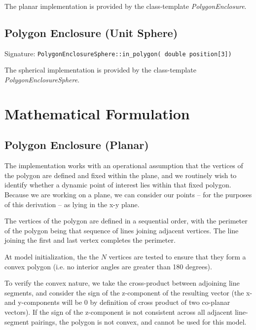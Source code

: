 \documentclass[11pt,fleqn]{report}
\begin{document}
The planar implementation is provided by the class-template
\textit{PolygonEnclosure}.

\subsection{Polygon Enclosure (Unit Sphere)}
Signature: \texttt{PolygonEnclosureSphere::in\_polygon( double position[3])}

The spherical implementation is provided by the class-template
\textit{PolygonEnclosureSphere}.

\section{Mathematical Formulation}

\subsection{Polygon Enclosure (Planar)}

The implementation works with an operational assumption that the vertices of
the polygon are defined and fixed within the plane, and we routinely wish to
identify whether a dynamic point of interest lies within that fixed polygon.
Because we are working on a plane, we can consider
our points -- for the purposes of this derivation -- as lying in the x-y
plane.

The vertices of the polygon are defined in a sequential order, with the
perimeter of the polygon being that sequence of lines joining adjacent
vertices. The line joining the first and last vertex completes the
perimeter.

At model initialization, the the $N$ vertices are tested to ensure that they
form a convex polygon (i.e. no interior angles are greater than 180
degrees).

To verify the convex nature, we take the cross-product between adjoining
line segments, and consider the sign of the z-component of the resulting
vector (the x- and y-components will be 0 by definition of cross product of
two co-planar vectors). If the sign of the z-component is not consistent
across all adjacent line-segment pairings, the polygon is not convex, and
cannot be used for this model.
\end{document}
